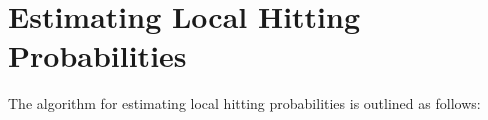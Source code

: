 \documentclass[english, aip, jcp, priprint, graphicx,floatfix]{revtex4-1}
\newcommand{\mathd}{\mathrm{d}}
\newcommand{\tmop}[1]{\ensuremath{\operatorname{#1}}}
\theoremstyle{plain}
\theoremstyle{definition}
\theoremstyle{plain}
\begin{document}


\section{Estimating Local Hitting Probabilities}\label{algorithm}
The algorithm for estimating local hitting probabilities is outlined as follows:
\end{document}
